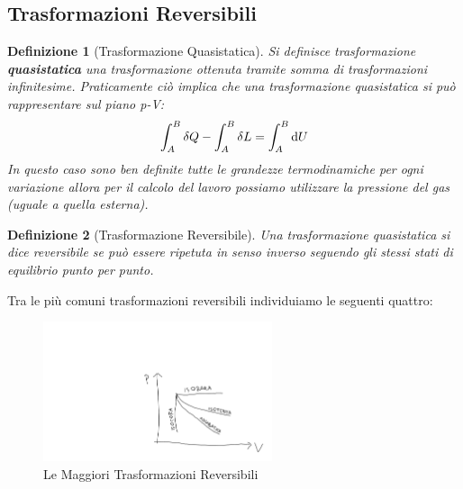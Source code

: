 \documentclass{article}
\newtheorem{defn}{Definizione}[section]
\begin{document}
\subsection{Trasformazioni Reversibili}
\begin{defn}[Trasformazione Quasistatica]
Si definisce trasformazione \textbf{quasistatica} una trasformazione ottenuta tramite somma di trasformazioni infinitesime. Praticamente ciò implica che una trasformazione quasistatica si può rappresentare sul piano p-V:
\[\int_A^B\delta Q-\int_A^B\delta L=\int_A^B\dif U\]
In questo caso sono ben definite tutte le grandezze termodinamiche per ogni variazione allora per il calcolo del lavoro possiamo utilizzare la pressione del gas (uguale a quella esterna). 
\end{defn}
\begin{defn}[Trasformazione Reversibile]
Una trasformazione quasistatica si dice reversibile se può essere ripetuta in senso inverso seguendo gli stessi stati di equilibrio punto per punto. 
\end{defn}
Tra le più comuni trasformazioni reversibili individuiamo le seguenti quattro:
\begin{figure}[H]
    \centering
    \includegraphics[width=0.6\textwidth]{TrasformazioniReversibili.png}
    \caption{Le Maggiori Trasformazioni Reversibili }
    \label{TrasfRevers}
\end{figure}
\end{document}
